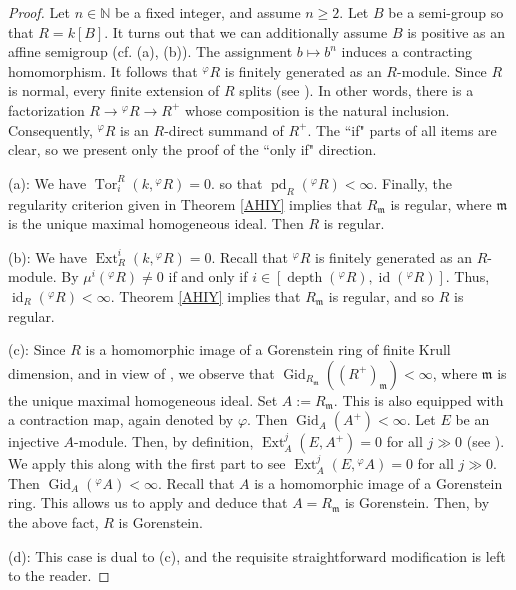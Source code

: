 \documentclass[12pt,reqno]{amsart}
\theoremstyle{definition}
\theoremstyle{remark}
\theoremstyle{cited}
\theoremstyle{remark}
\theoremstyle{citeddef}
\DeclareMathOperator{\Ext}{Ext}
\DeclareMathOperator{\depth}{depth}
\DeclareMathOperator{\id}{id}
\newcommand{\up}[1]{{{}^{#1}\!}}
\newcommand{\fm}{\mathfrak{m}}
\begin{document}
	\begin{proof} 
		Let $n\in \mathbb{N}$ be a fixed integer, and assume 
		$n
		\geq 2$. Let $B$ be a semi-group so that $R=k[B]$. It turns out that we can additionally assume 
		$B$ is positive as an affine semigroup (cf. \cite[Proposition 6.1.3]{BH} (a), (b)). The assignment $b\mapsto b^n$ induces a contracting homomorphism.
		It follows that $\up{\varphi}R$  is finitely
		generated as an $R$-module. 
		Since \(R\) is normal, every finite extension of \(R\) splits (see \cite[Lemma 2.1]{Shravan}).
		In other words, there is a factorization 
		\( 
		R \to\up{\varphi}R  \to R^+
		\)
		whose composition is the natural inclusion. Consequently,
		$\up{\varphi}R $ is an $R$-direct summand of $R^+$.
		The ``if" parts of all items are clear, so we present only the proof of the ``only if" direction.
		
		
		(a):  We have
		\(
		\operatorname{Tor}^R_i(k, \up{\varphi}R )=0.
		\) 
		so that
		$ 
		\operatorname{pd}_R(\up{\varphi}R )<\infty.
		$ 
		Finally, the regularity  criterion given in 
		Theorem \ref{AHIY} implies that $R_{\fm}$ is regular, where $\fm$
		is the unique maximal homogeneous ideal. Then 
		$R$ is regular.
		
		(b): We have
		\(
		\Ext^i_R(k, \up{\varphi}R )=0.
		\) Recall  that $\up{\varphi}R$  is finitely
		generated as an $R$-module. By \cite[2.2]{Ro2}
		$\mu ^i(\up{\varphi}R)\neq  0$ if and only if $i\in[\depth(\up{\varphi}R),\id(\up{\varphi}R)]$. Thus,
		$ 
		\operatorname{id}_R(\up{\varphi}R )<\infty
		$.
		Theorem \ref{AHIY} implies that $R_{\fm}$ is regular, and so
		$R$ is regular.
		
		
		(c): Since $R$ is a homomorphic image of a Gorenstein
		ring of finite Krull dimension, and 
		in view of \cite[Proposition 3.20]{Totally}, we observe that $\operatorname{Gid}_{R_{\fm}}((R^+)_{\fm})<\infty$, 
		where $\fm$
		is the unique maximal homogeneous ideal. Set $A:=R_{\fm}$. This is also equipped with a contraction map, again denoted by $\varphi$. Then
		$\operatorname{Gid}_{A}(A^+)<\infty$.
		Let $E$ be an injective $A$-module. Then, by definition, $\Ext^j_A(E,A^+)=0$ for all $j\gg 0$ (see \cite[Theorem 3.6]{Totally}). We apply this along with the first part to see  $\Ext^j_A(E,\up{\varphi}A )=0$ for all $j\gg 0$.  Then $\operatorname{Gid}_A(\up{\varphi}A)<\infty$.
		Recall that $A$ is a homomorphic image of a Gorenstein ring. This allows us to apply  \cite[Theorem 5.5]{FF} and deduce that
		$A=R_{\fm}$ is Gorenstein. Then, by the above fact,
		$R$  is Gorenstein.
		
		
		(d): This case is dual to (c), and the requisite straightforward modification is left to the reader.
	\end{proof}
	
\end{document}
